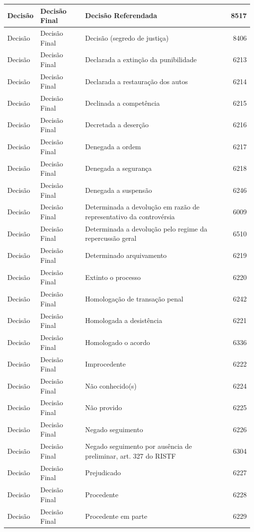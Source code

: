 \documentclass[
]{book}
\begin{document}
\begin{tabular}{l|l|l|r}
\hline
Decisão & Decisão Final & Decisão Referendada & 8517\\
\hline
Decisão & Decisão Final & Decisão (segredo de justiça) & 8406\\
\hline
Decisão & Decisão Final & Declarada a extinção da punibilidade & 6213\\
\hline
Decisão & Decisão Final & Declarada a restauração dos autos & 6214\\
\hline
Decisão & Decisão Final & Declinada a competência & 6215\\
\hline
Decisão & Decisão Final & Decretada a deserção & 6216\\
\hline
Decisão & Decisão Final & Denegada a ordem & 6217\\
\hline
Decisão & Decisão Final & Denegada a segurança & 6218\\
\hline
Decisão & Decisão Final & Denegada a suspensão & 6246\\
\hline
Decisão & Decisão Final & Determinada a devolução em razão de representativo da controvérsia & 6009\\
\hline
Decisão & Decisão Final & Determinada a devolução pelo regime da repercussão geral & 6510\\
\hline
Decisão & Decisão Final & Determinado arquivamento & 6219\\
\hline
Decisão & Decisão Final & Extinto o processo & 6220\\
\hline
Decisão & Decisão Final & Homologação de transação penal & 6242\\
\hline
Decisão & Decisão Final & Homologada a desistência & 6221\\
\hline
Decisão & Decisão Final & Homologado o acordo & 6336\\
\hline
Decisão & Decisão Final & Improcedente & 6222\\
\hline
Decisão & Decisão Final & Não conhecido(s) & 6224\\
\hline
Decisão & Decisão Final & Não provido & 6225\\
\hline
Decisão & Decisão Final & Negado seguimento & 6226\\
\hline
Decisão & Decisão Final & Negado seguimento por ausência de preliminar, art. 327 do RISTF & 6304\\
\hline
Decisão & Decisão Final & Prejudicado & 6227\\
\hline
Decisão & Decisão Final & Procedente & 6228\\
\hline
Decisão & Decisão Final & Procedente em parte & 6229\\

\end{tabular}
\end{document}
